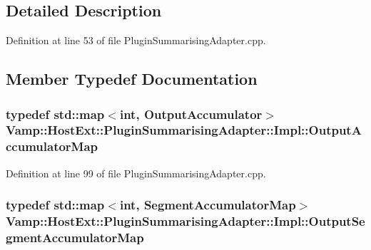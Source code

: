 \subsection{Detailed Description}


Definition at line 53 of file Plugin\+Summarising\+Adapter.\+cpp.



\subsection{Member Typedef Documentation}
\subsubsection[{\texorpdfstring{Output\+Accumulator\+Map}{OutputAccumulatorMap}}]{\setlength{\rightskip}{0pt plus 5cm}typedef {\bf std\+::map}$<${\bf int}, {\bf Output\+Accumulator}$>$ {\bf Vamp\+::\+Host\+Ext\+::\+Plugin\+Summarising\+Adapter\+::\+Impl\+::\+Output\+Accumulator\+Map}\hspace{0.3cm}{\ttfamily [protected]}}\hypertarget{class_vamp_1_1_host_ext_1_1_plugin_summarising_adapter_1_1_impl_a9f0659491f7b4894576b6bb8448df68d}{}\label{class_vamp_1_1_host_ext_1_1_plugin_summarising_adapter_1_1_impl_a9f0659491f7b4894576b6bb8448df68d}


Definition at line 99 of file Plugin\+Summarising\+Adapter.\+cpp.

\subsubsection[{\texorpdfstring{Output\+Segment\+Accumulator\+Map}{OutputSegmentAccumulatorMap}}]{\setlength{\rightskip}{0pt plus 5cm}typedef {\bf std\+::map}$<${\bf int}, {\bf Segment\+Accumulator\+Map}$>$ {\bf Vamp\+::\+Host\+Ext\+::\+Plugin\+Summarising\+Adapter\+::\+Impl\+::\+Output\+Segment\+Accumulator\+Map}\hspace{0.3cm}{\ttfamily [protected]}}\hypertarget{class_vamp_1_1_host_ext_1_1_plugin_summarising_adapter_1_1_impl_a6b12d5110338dc49aadebec6a9df6cb9}{}\label{class_vamp_1_1_host_ext_1_1_plugin_summarising_adapter_1_1_impl_a6b12d5110338dc49aadebec6a9df6cb9}


